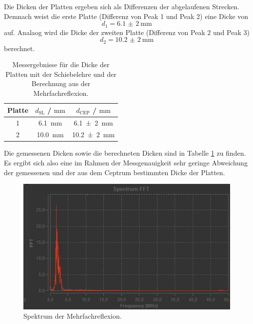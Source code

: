 Die Dicken der Platten ergeben sich als Differenzen der abgelaufenen Strecken.
Demnach weist die erste Platte (Differenz von Peak 1 und Peak 2) eine Dicke von
\begin{equation*}
	d_1 = \SI{6,1(2)}{\milli\meter}
\end{equation*}
auf.
Analaog wird die Dicke der zweiten Platte (Differenz von Peak 2 und Peak 3)
\begin{equation*}
	d_2 = \SI{10,2(2)}{\milli\meter}
\end{equation*}
berechnet.
\begin{table}
\centering
	\caption{Messergebnisse für die Dicke der Platten mit der Schiebelehre und der Berechnung aus der Mehrfachreflexion.}
\label{tab:ceperg}
	\begin{tabular}{ccc}
	\toprule
		Platte & $d_{\mathrm{SL}}$ / $\si{\milli\meter}$ & $d_{\mathrm{CEP}}$ / $\si{\milli\meter}$ \\
	\midrule
		1 & \SI{6,1}{\milli\meter} & \SI{6,1(2)}{\milli\meter} \\
		2 & \SI{10,0}{\milli\meter} & \SI{10,2(2)}{\milli\meter} \\
	\bottomrule
	\end{tabular}
\end{table}
Die gemessenen Dicken sowie die berechneten Dicken sind in Tabelle \ref{tab:ceperg} zu finden.
Es ergibt sich also eine im Rahmen der Messgenauigkeit sehr geringe Abweichung der gemessenen
und der aus dem Ceptrum bestimmten Dicke der Platten.
\begin{figure}
  \centering
  \includegraphics[width=\textwidth]{Messdaten/fft.jpg}
  \caption{Spektrum der Mehrfachreflexion.}
  \label{fig:spektrum}
\end{figure}

\FloatBarrier
